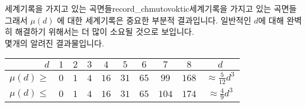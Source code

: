 \begin{surferIntroPage}{세계기록을 가지고 있는 곡면들}{record_chmutovoktic}{세계기록을 가지고 있는 곡면들}
그래서 $\mu(d)$ 에 대한 세계기록은 중요한 부분적 결과입니다. 일반적인 $d$에 대해 완벽히 해결하기 위해서는 더 많이 소요될 것으로 보입니다. \\  몇개의 알려진 결과물입니다.  
    
   \begin{center}
      \begin{tabular}{r|cccccccc|c}
        $d$ & $1$ & $2$ & $3$ & $4$ & $5$ & $6$ & $7$ & $8$ & $d$\\
        \hline
        \hline
        \rule{0pt}{1.2em}$\mu(d)\ge$ & $0$ & $1$ & $4$ & $16$ & $31$ & $65$ &
        $99$ & $168$ & 
        $\approx \frac{5}{12}d^3$\\[0.3em]
        \hline
        \rule{0pt}{1.2em}$\mu(d)\le$ & $0$ & $1$ & $4$ & $16$ & $31$ & $65$ &
        $104$ & $174$ & $\approx \frac{4}{9}d^3$
      \end{tabular}
    \end{center}
\end{surferIntroPage}

